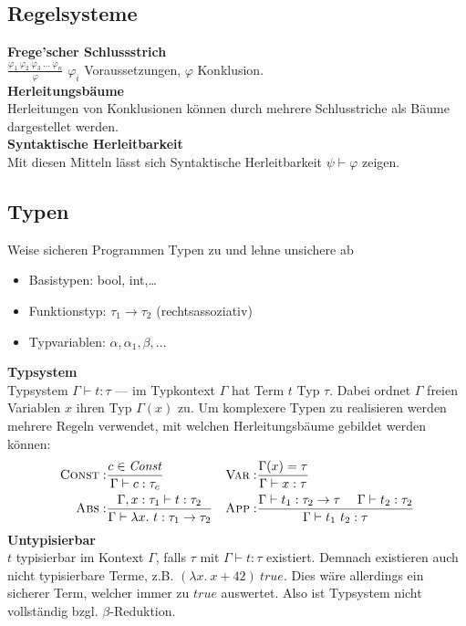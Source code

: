 \subsection{Regelsysteme}%
\label{tg:sub:regelsysteme}
\textbf{Frege'scher Schlussstrich}\\
\(\frac{\varphi_1\ \varphi_2\ \varphi_3\ \ldots\ \varphi_n}{\varphi}\) \(\varphi_i\) Voraussetzungen, \(\varphi\) Konklusion.\\
\textbf{Herleitungsbäume}\\
Herleitungen von Konklusionen können durch mehrere Schlusstriche als Bäume dargestellet werden.\\
\textbf{Syntaktische Herleitbarkeit}\\
Mit diesen Mitteln lässt sich Syntaktische Herleitbarkeit \(\psi \vdash \varphi\) zeigen.

\subsection{Typen}%
\label{tg:sub:typen}
Weise sicheren Programmen Typen zu und lehne unsichere ab
\begin{itemize}
  \item Basistypen: bool, int,\ldots
  \item Funktionstyp: \(\tau_1 \rightarrow \tau_2\) (rechtsassoziativ)
  \item Typvariablen: \(\alpha, \alpha_1, \beta,\ldots \)
\end{itemize}
\textbf{Typsystem}\\
Typsystem \(\Gamma \vdash t: \tau\) --- im Typkontext \(\Gamma\) hat Term \(t\) Typ \(\tau\). Dabei ordnet \(\Gamma\)
freien Variablen \(x\) ihren Typ \(\Gamma(x)\) zu.
Um komplexere Typen zu realisieren werden mehrere Regeln verwendet, mit welchen Herleitungsbäume gebildet werden können:\\
\begin{align*}
  \textsc{Const}:& \frac{c \in \mathit{Const}}{\Gamma \vdash c: \tau_c} &
  \textsc{Var}:&   \frac{\Gamma(x) = \tau}{\Gamma \vdash x: \tau}\\
  \textsc{Abs}:&   \frac{\Gamma, x: \tau_1 \vdash t: \tau_2}{\Gamma \vdash \lambda x.\ t: \tau_1 \rightarrow \tau_2} &
  \textsc{App}:&   \frac{\Gamma \vdash t_1: \tau_2 \rightarrow \tau \ \ \ \ \Gamma \vdash t_2: \tau_2}{\Gamma \vdash t_1\ t_2: \tau}                                                                                                                      
\end{align*}
\textbf{Untypisierbar}\\
\(t\) typisierbar im Kontext \(\Gamma\), falls \(\tau\) mit \(\Gamma \vdash t: \tau\) existiert.
Demnach existieren auch nicht typisierbare Terme, z.B. \((\lambda x.\ x + 42)\ \mathit{true}\).
Dies wäre allerdings ein sicherer Term, welcher immer zu \(\mathit{true}\) auswertet. Also ist Typsystem nicht vollständig
bzgl. \(\beta\)-Reduktion.

